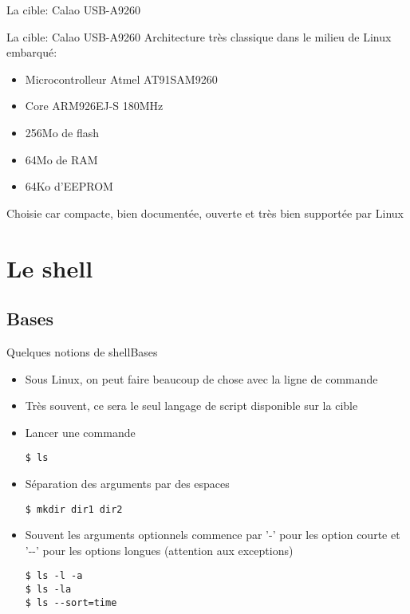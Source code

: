 \begin{frame}{La cible: Calao USB-A9260}
  \begin{center}
    \hspace{1cm}
  \end{center}
\end{frame}

\begin{frame}{La cible: Calao USB-A9260}
  Architecture très classique dans le milieu de Linux embarqué:
  \begin{itemize}
  \item Microcontrolleur Atmel AT91SAM9260
  \item Core ARM926EJ-S 180MHz
  \item 256Mo de flash
  \item 64Mo de RAM
  \item 64Ko d'EEPROM
  \end{itemize}
  Choisie  car  compacte,  bien   documentée,  ouverte  et  très  bien
  supportée par Linux
\end{frame}

\section{Le shell}

\subsection{Bases}

\begin{frame}[fragile=singleslide]{Quelques notions de shell}{Bases}
  \begin{itemize}
  \item Sous Linux,  on peut faire beaucoup de chose  avec la ligne de
    commande
  \item Très souvent, ce sera le seul langage de script disponible sur
    la cible
  \item Lancer une commande
\begin{lstlisting}
$ ls
\end{lstlisting} %
  \item Séparation des arguments par des espaces
\begin{lstlisting}
$ mkdir dir1 dir2
\end{lstlisting} %
    \item Souvent  les arguments optionnels commence par  '-' pour les
      option courte et '-\--'  pour les options longues (attention aux
      exceptions)
\begin{lstlisting}
$ ls -l -a
$ ls -la
$ ls --sort=time
\end{lstlisting} %
  \end{itemize}
\end{frame}

